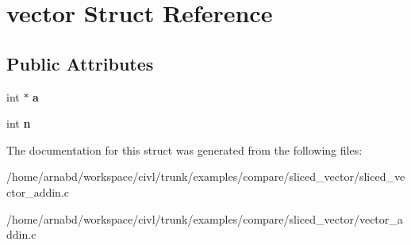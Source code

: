 \hypertarget{structvector}{}\section{vector Struct Reference}
\label{structvector}
\subsection*{Public Attributes}
\begin{DoxyCompactItemize}
\item 
\hypertarget{structvector_a55c254232613d1d01ca14c1f118b1515}{}int $\ast$ {\bfseries a}\label{structvector_a55c254232613d1d01ca14c1f118b1515}

\item 
\hypertarget{structvector_a0bd97601c84f33258823f44184f94404}{}int {\bfseries n}\label{structvector_a0bd97601c84f33258823f44184f94404}

\end{DoxyCompactItemize}


The documentation for this struct was generated from the following files\+:\begin{DoxyCompactItemize}
\item 
/home/arnabd/workspace/civl/trunk/examples/compare/sliced\+\_\+vector/sliced\+\_\+vector\+\_\+addin.\+c\item 
/home/arnabd/workspace/civl/trunk/examples/compare/sliced\+\_\+vector/vector\+\_\+addin.\+c\end{DoxyCompactItemize}
